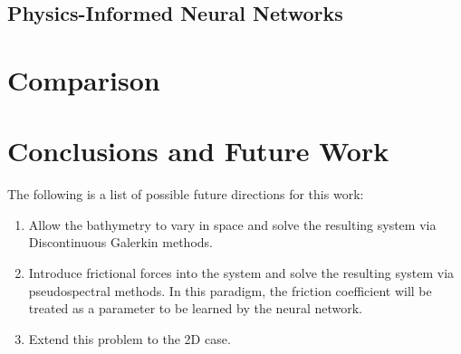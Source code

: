 \documentclass[letterpaper,11pt]{article}
\begin{document}
    

    \subsection{Physics-Informed Neural Networks}\label{subsec:pinn-methodology}

    

    \section{Comparison}\label{sec:comparison}
    
    \section{Conclusions and Future Work}\label{sec:conclusion}

    The following is a list of possible future directions for this work:

    \begin{enumerate}
        \item Allow the bathymetry to vary in space and solve the resulting system via Discontinuous Galerkin methods.
        \item Introduce frictional forces into the system and solve the resulting system via pseudospectral methods. In
              this paradigm, the friction coefficient will be treated as a parameter to be learned by the neural 
              network.
        \item Extend this problem to the 2D case.
    \end{enumerate}

    \pagebreak

    
    

    \pagebreak
    \appendix
    
\end{document}
